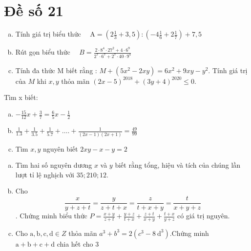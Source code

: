 \onehalfspacing
\section{Đề số 21}
\graphicspath{{./img/}}
\begin{bt} 
    \hfill
    \begin{enumerate}[a.]
        \item Tính giá trị biểu thức $\quad \mathrm{A}=\left(2 \frac{1}{3}+3,5\right):\left(-4 \frac{1}{6}+2 \frac{1}{7}\right)+7,5$
        \item Rút gọn biểu thức $\quad B=\frac{2 \cdot 8^4 \cdot 27^2+4 \cdot 6^9}{2^7 \cdot 6^7+2^7 \cdot 40 \cdot 9^4}$
        \item Tính đa thức $\mathrm{M}$ biết rằng : $M+\left(5 x^2-2 x y\right)=6 x^2+9 x y-y^2$. Tính giá trị của $M$ khi $x, y$ thỏa mãn $(2 x-5)^{2018}+(3 y+4)^{2020} \leq 0$.
    \end{enumerate}
\loigiai{}
\end{bt}

\begin{bt}
    Tìm x biết: 
	\begin{enumerate}[a.]
        \item $-\frac{15}{12} x+\frac{3}{7}=\frac{6}{5} x-\frac{1}{2}$
        \item $\frac{1}{1.3}+\frac{1}{3.5}+\frac{1}{5.7}+\ldots .+\frac{1}{(2 x-1)(2 x+1)}=\frac{49}{99}$
        \item Tìm $x, y$ nguyên biết $2 x y-x-y=2$
    \end{enumerate}
	\loigiai{} 
\end{bt}

\begin{bt}
    \hfill
	\begin{enumerate}[a.]
        \item Tìm hai số nguyên dương $x$ và $y$ biết rằng tổng, hiệu và tích của chúng lần lượt tỉ lệ nghịch với $35 ; 210 ; 12$.
        \item Cho $$\frac{x}{y+z+t}=\frac{y}{z+t+x}=\frac{z}{t+x+y}=\frac{t}{x+y+z}$$. Chứng minh biểu thức $P=\frac{x+y}{z+t}+\frac{y+z}{t+x}+\frac{z+t}{x+y}+\frac{t+x}{y+z}$ có giá trị nguyên.
        \item Cho $\mathrm{a}, \mathrm{b}, \mathrm{c}, \mathrm{d} \in Z$ thỏa mãn $a^3+b^3=2\left(c^3-8 \mathrm{~d}^3\right)$.Chứng minh $\mathrm{a}+\mathrm{b}+\mathrm{c}+\mathrm{d}$ chia hết cho 3
    \end{enumerate}
	\loigiai{}
\end{bt}

